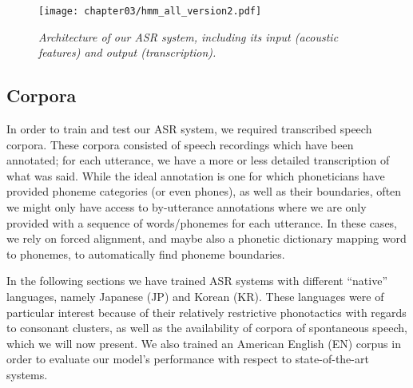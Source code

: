 \begin{figure}[htb]
\centering
\texttt{[image: chapter03/hmm\_all\_version2.pdf]}
\caption{\textit{Architecture of our ASR system, including its input (acoustic features) and output (transcription).}}
\label{fig:hmm_architecture}
\end{figure}

\subsection{Corpora}

In order to train and test our ASR system, we required transcribed speech corpora. These corpora consisted of speech recordings which have been annotated; for each utterance, we have a more or less detailed transcription of what was said.
While the ideal annotation is one for which phoneticians have provided phoneme categories (or even phones), as well as their boundaries, often we might only have access to by-utterance annotations where we are only provided with a sequence of words/phonemes for each utterance. In these cases, we rely on forced alignment, and maybe also a phonetic dictionary mapping word to phonemes, to automatically find phoneme boundaries.

In the following sections we have trained ASR systems with different ``native'' languages, namely Japanese (JP) and Korean (KR). These languages were of particular interest because of their relatively restrictive phonotactics with regards to consonant clusters, as well as the availability of corpora of spontaneous speech, which we will now present. We also trained an American English (EN) corpus in order to evaluate our model's performance with respect to state-of-the-art systems. 

